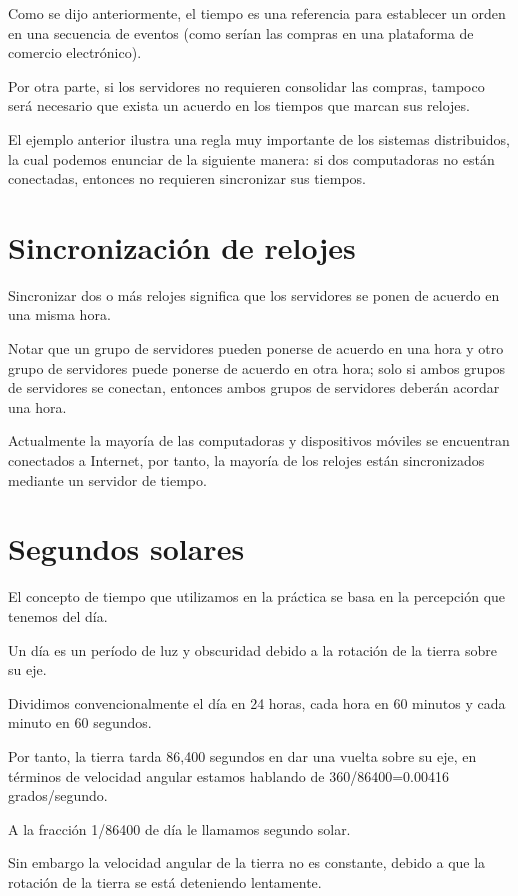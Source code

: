 \documentclass[11pt,a4paper,oneside]{book}
\begin{document}
Como se dijo anteriormente, el tiempo es una referencia para establecer un orden en una secuencia de eventos (como serían las compras en una plataforma de comercio electrónico).

Por otra parte, si los servidores no requieren consolidar las compras, tampoco será necesario que exista un acuerdo en los tiempos que marcan sus relojes.

El ejemplo anterior ilustra una regla muy importante de los sistemas distribuidos, la cual podemos enunciar de la siguiente manera: si dos computadoras no están conectadas, entonces no requieren sincronizar sus tiempos.

\section{Sincronización de relojes}

Sincronizar dos o más relojes significa que los servidores se ponen de acuerdo en una misma hora.

Notar que un grupo de servidores pueden ponerse de acuerdo en una hora y otro grupo de servidores puede ponerse de acuerdo en otra hora; solo si ambos grupos de servidores se conectan, entonces ambos grupos de servidores deberán acordar una hora.

Actualmente la mayoría de las computadoras y dispositivos móviles se encuentran conectados a Internet, por tanto, la mayoría de los relojes están sincronizados mediante un servidor de tiempo.

\section{Segundos solares}

El concepto de tiempo que utilizamos en la práctica se basa en la percepción que tenemos del día.

Un día es un período de luz y obscuridad debido a la rotación de la tierra sobre su eje.

Dividimos convencionalmente el día en 24 horas, cada hora en 60 minutos y cada minuto en 60 segundos.

Por tanto, la tierra tarda 86,400 segundos en dar una vuelta sobre su eje, en términos de velocidad angular estamos hablando de 360/86400=0.00416 grados/segundo.

A la fracción 1/86400 de día le llamamos segundo solar.

Sin embargo la velocidad angular de la tierra no es constante, debido a que la rotación de la tierra se está deteniendo lentamente.
\end{document}
